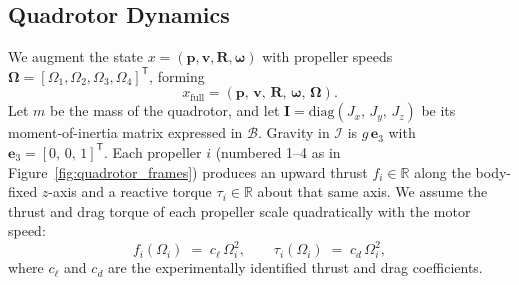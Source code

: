 \subsection{Quadrotor Dynamics}
\label{sec:quadrotor_dynamics}
We augment the state \(x=(\mathbf{p},\mathbf{v},\mathbf{R},\boldsymbol{\omega})\) with propeller speeds \(\boldsymbol{\Omega}=[\Omega_1,\Omega_2,\Omega_3,\Omega_4]^\mathsf{T}\), forming
\begin{equation}
x_{\mathrm{full}} = (\mathbf{p},\,\mathbf{v},\,\mathbf{R},\,\boldsymbol{\omega},\,\boldsymbol{\Omega}).
\end{equation}
Let \(m\) be the mass of the quadrotor, and let \(\mathbf{I} = \mathrm{diag}(J_{x},\,J_{y},\,J_{z})\) be its moment-of-inertia matrix expressed in \(\mathcal{B}\). Gravity in \(\mathcal{I}\) is \(g\,\mathbf{e}_{3}\) with \(\mathbf{e}_{3} = [0,\,0,\,1]^{\mathsf{T}}\). Each propeller \(i\) (numbered 1–4 as in Figure~\ref{fig:quadrotor_frames}) produces an upward thrust \(f_{i} \in \mathbb{R}\) along the body-fixed \(z\)-axis and a reactive torque \(\tau_{i}\in \mathbb{R}\) about that same axis. We assume the thrust and drag torque of each propeller scale quadratically with the motor speed:
\begin{equation}
f_{i}(\Omega_{i}) \;=\; c_{\ell}\,\Omega_{i}^{2}, 
\qquad 
\tau_{i}(\Omega_{i}) \;=\; c_{d}\,\Omega_{i}^{2},
\end{equation}
where \(c_{\ell}\) and \(c_{d}\) are the experimentally identified thrust and drag coefficients.


